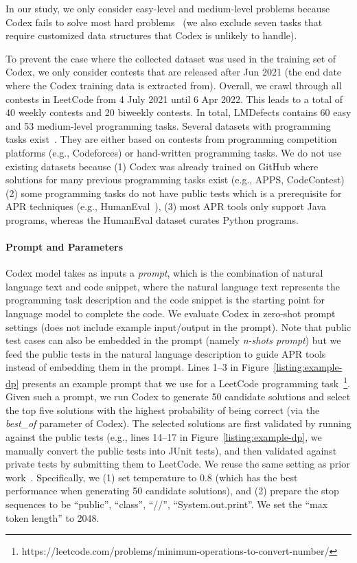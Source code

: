 In our study, we only consider easy-level and medium-level problems because Codex fails to solve most hard problems~\cite{codex} (we also exclude seven tasks that require customized data structures that Codex is unlikely to handle).

To prevent the case where the collected dataset was used in the training set of Codex, we only consider contests that are released after Jun 2021 (the end date where the Codex training data is extracted from). Overall, we crawl through all contests in LeetCode from 4 July 2021 until 6 Apr 2022. This leads to a total of 40 weekly contests and 20 biweekly contests. In total, LMDefects contains 60 easy and 53 medium-level programming tasks. Several datasets with programming tasks exist~\cite{codex,alphacode,apps,tan2017codeflaws,Caballero_Description2Code_Dataset_2016,codenet}. They are either based on contests from programming competition platforms (e.g., Codeforces) or hand-written programming tasks. We do not use existing datasets because (1) Codex was already trained on GitHub where solutions for many previous programming tasks exist (e.g., APPS, CodeContest) (2) some programming tasks do not have public tests which is a prerequisite for APR techniques (e.g., HumanEval~\cite{codex}), (3) most APR tools only support Java programs, whereas the HumanEval dataset curates Python programs.

\paragraph{\textbf{Prompt and Parameters}}

Codex model takes as inputs a \emph{prompt}, which is the combination of natural language text and code snippet, where the natural language text represents the programming task description and the code snippet is the starting point for language model to complete the code. We evaluate Codex in zero-shot prompt settings (does not include example input/output in the prompt). Note that public test cases can also be embedded in the prompt (namely \emph{n-shots prompt}) but we feed the public tests in the natural language description to guide APR tools instead of embedding them in the prompt. Lines 1--3 in Figure~\ref{listing:example-dp} presents an example prompt that we use for a LeetCode programming task~\footnote{https://leetcode.com/problems/minimum-operations-to-convert-number/}. 
Given such a prompt, we run Codex to generate 50 candidate solutions and select the top five solutions with the highest probability of being correct (via the \emph{best\_of} parameter of Codex). The selected solutions are first validated by running against the public tests (e.g., lines 14--17 in Figure~\ref{listing:example-dp}, we manually convert the public tests into JUnit tests), and then validated against private tests by submitting them to LeetCode. We reuse the same setting as prior work~\cite{codex}. Specifically, we (1) set temperature to 0.8 (which has the best performance when generating 50 candidate solutions), and (2) prepare the stop sequences to be ``public'', ``class'', ``//'', ``System.out.print''. We set the ``max token length'' to 2048.

